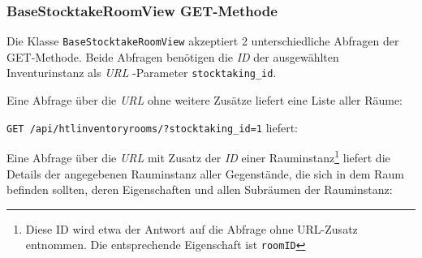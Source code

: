 \subsubsection*{BaseStocktakeRoomView GET-Methode}

Die Klasse \texttt{BaseStocktakeRoomView} akzeptiert 2 unterschiedliche
Abfragen der GET-Methode. Beide Abfragen benötigen die \emph{ID}
der ausgewählten Inventurinstanz als \emph{URL}
-Parameter
\texttt{stocktaking\_id}.

Eine Abfrage über die \emph{URL}
 ohne weitere Zusätze
liefert eine Liste aller Räume:

\texttt{GET\ /api/htlinventoryrooms/?stocktaking\_id=1} liefert:

\begin{Shaded}
\begin{Highlighting}[]
\FunctionTok{\{}
    \FunctionTok{:} \OtherTok{[}\FunctionTok{\{}
            \FunctionTok{:} \FunctionTok{,}
            \FunctionTok{:} \FunctionTok{,}
            \FunctionTok{:} \FunctionTok{,}
            \FunctionTok{:} \FunctionTok{,}
            \FunctionTok{:} 
        \FunctionTok{\}}\OtherTok{,} \FunctionTok{\{}
            \FunctionTok{:} \FunctionTok{,}
            \FunctionTok{:} \FunctionTok{,}
            \FunctionTok{:} \FunctionTok{,}
            \FunctionTok{:} \FunctionTok{,}
            \FunctionTok{:} 
        \FunctionTok{\}}\OtherTok{,}
    \OtherTok{]}
\FunctionTok{\}}
\end{Highlighting}
\end{Shaded}

Eine Abfrage über die \emph{URL}
 mit Zusatz der \emph{ID}
einer Rauminstanz\footnote{Diese ID wird etwa der Antwort auf die
  Abfrage ohne URL-Zusatz entnommen. Die entsprechende Eigenschaft ist
  \texttt{roomID}} liefert die Details der angegebenen Rauminstanz
\inkl{} aller Gegenstände, die sich in dem Raum befinden sollten, deren
Eigenschaften und allen Subräumen der Rauminstanz:

